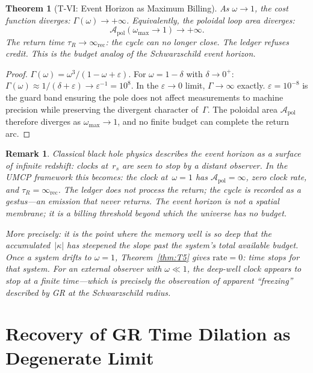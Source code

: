 \documentclass[
  aps,
  prd,
  twocolumn,
  superscriptaddress,
  nofootinbib,
  floatfix
]{revtex4-2}
\newtheorem{theorem}{Theorem}
\newtheorem{remark}{Remark}
\newcommand{\tR}{\tau_{\!R}}
\newcommand{\Gam}{\Gamma}
\newcommand{\eps}{\varepsilon}
\newcommand{\IR}{\infty_{\mathrm{rec}}}
\newcommand{\Apol}{\mathcal{A}_{\mathrm{pol}}}         %
\begin{document}
\begin{theorem}[T-VI: Event Horizon as Maximum Billing]
\label{thm:T6}
As $\omega \to 1$, the cost function diverges:
$\Gam(\omega) \to +\infty$.  Equivalently, the poloidal
loop area diverges:
\begin{equation}
  \Apol(\omega_{\max} \to 1) \to +\infty.
  \label{eq:horiz}
\end{equation}
The return time $\tR \to \IR$: the cycle can no longer
close.  The ledger refuses credit.  This is the budget
analog of the Schwarzschild event horizon.
\end{theorem}

\begin{proof}
$\Gam(\omega) = \omega^3/(1-\omega+\eps)$.  For
$\omega = 1 - \delta$ with $\delta \to 0^+$:
$\Gam(\omega) \approx 1/(\delta + \eps) \to \eps^{-1} =
10^8$.  In the $\eps \to 0$ limit, $\Gam \to \infty$
exactly.  $\eps = 10^{-8}$ is the guard band ensuring the
pole does not affect measurements to machine precision
while preserving the divergent character of~$\Gam$.
The poloidal area $\Apol$ therefore diverges as $\omega_{\max}
\to 1$, and no finite budget can complete the return arc.
\end{proof}

\begin{remark}
Classical black hole physics \cite{misner1973gravitation}
describes the event horizon as a surface of infinite
redshift: clocks at~$r_s$ are seen to stop by a distant
observer.  In the UMCP framework this becomes: the clock
at~$\omega = 1$ has $\Apol = \infty$, zero clock rate, and
$\tR = \IR$.  The ledger does not process the return; the
cycle is recorded as a \emph{gestus}---an emission that
never returns.  The event horizon is not a spatial membrane;
it is a billing threshold beyond which the universe has no
budget.

More precisely: it is the point where the memory well is
so deep that the accumulated~$|\kappa|$ has steepened the
slope past the system's total available budget.  Once a
system drifts to $\omega = 1$, Theorem~\ref{thm:T5} gives
$\text{rate} = 0$: time stops for that system.  For an
external observer with $\omega \ll 1$, the deep-well clock
appears to stop at a finite time---which is precisely the
observation of apparent ``freezing'' described by GR at
the Schwarzschild radius.
\end{remark}

\section{Recovery of GR Time Dilation as Degenerate Limit}
\label{sec:gr}
\end{document}
